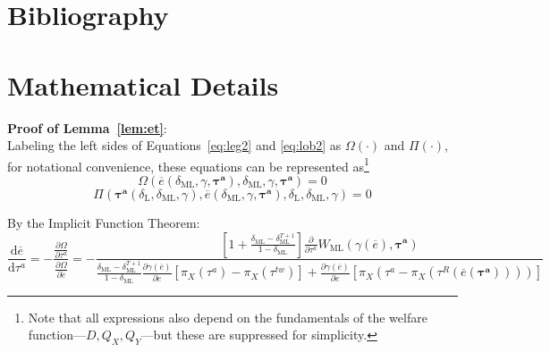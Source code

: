 \documentclass[authoryear, review]{elsarticle}
\newcommand{\ov}{\overline}
\newcommand{\bta}{\bm{\tau^a}}
\newcommand{\ga}{\gamma}
\newcommand{\de}{\delta}
\begin{document}
\section{Bibliography}

%


\newpage
\appendix

\section{Mathematical Details}
\noindent \textbf{\hypertarget{Cor_et}{Proof of Lemma~\ref{lem:et}}}: \\
Labeling the left sides of Equations~\ref{eq:leg2} and \ref{eq:lob2} as $\Omega\left(\cdot\right)$ and $\Pi\left(\cdot\right)$, for notational convenience, these equations can be represented as\footnote{Note that all expressions also depend on the fundamentals of the welfare function---$D,Q_X,Q_Y$---but these are suppressed for simplicity.}
\begin{equation}
  \Omega\left(\ov{e}\left(\de_\text{ML},\ga,\bta \right),\de_\text{ML},\ga,\bta \right) = 0
	\label{eq:leg3}
\end{equation}
\begin{equation}
  \Pi\left(\bta\left(\de_\text{L},\de_\text{ML},\ga\right),\ov{e}\left(\de_\text{ML},\ga,\bta\right),\de_\text{L},\de_\text{ML},\ga \right) = 0
  \label{eq:lob3}
\end{equation}

By the Implicit Function Theorem:
\begin{equation}
 	\frac{\mathrm{d} \ov{e}}{\mathrm{d} \tau^a} = -\frac{\frac{\partial \Omega}{\partial \tau^a}}{\frac{\partial \Omega}{\partial \ov{e}}} = -
	\textstyle \frac{\left[1+ \frac{\de_\text{ML} - \de_\text{ML}^{T+1}}{1-\de_\text{ML}}  \right]\frac{\partial}{\partial \tau^a}W_\text{ML}(\ga(\ov{e}),\bta)} {\frac{\de_\text{ML} - \de_\text{ML}^{T+1}}{1-\de_\text{ML}}\frac{\partial \ga(\ov{e})}{\partial e}\left[ \pi_X(\tau^a) - \pi_X(\tau^{tw}) \right] + \frac{\partial \ga(\ov{e})}{\partial e}\left[\pi_X(\tau^{a} - \pi_X(\tau^R(\ov{e}(\bta)))) \right]}
	\label{eq:coret}
\end{equation}
\end{document}
